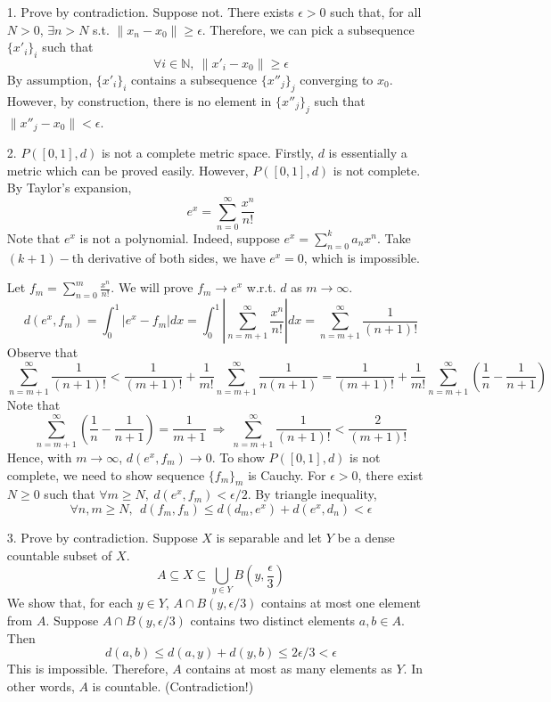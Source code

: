 
\begin{itemize}
	\item[1.] Prove by contradiction. Suppose not. There exists $\epsilon > 0$ such that, for all $N>0$, $\exists n > N$ s.t. $\lVert x_n - x_0\rVert  \ge \epsilon$. Therefore, we can pick a subsequence $\{x'_{i}\}_i$ such that 
	$$
	\forall i\in \mathbb{N},~\lVert x'_i - x_0\rVert \ge \epsilon	
	$$
	By assumption, $\{x'_i\}_i$ contains a subsequence $\{x''_j\}_j$ converging to $x_0$. However, by construction, there is no element in $\{x''_j\}_j$ such that $\lVert x''_j -x_0\rVert < \epsilon$.
	
	\item[2.] 
	$P([0,1],d)$ is not a complete metric space. Firstly, $d$ is essentially a metric which can be proved easily. However, $P([0,1],d)$ is not complete.
	By Taylor's expansion, 
	$$e^x = \sum_{n=0}^\infty \frac{x^n}{n!}$$ 
	Note that $e^x$ is not a polynomial. Indeed, suppose $e^x = \sum_{n=0}^k a_nx^n$. Take $(k+1)-$th derivative of both sides, we have $e^x = 0$, which is impossible.  
	
	Let $f_m = \sum_{n=0}^m \frac{x^n}{n!}$. We will prove $f_m\rightarrow e^x$ w.r.t. $d$ as $m\rightarrow \infty$.
	$$
	d\left(e^x, f_m\right) = \int_{0}^1 \left\lvert e^x - f_m \right\rvert dx = \int_{0}^1 \left\lvert \sum_{n=m+1}^\infty \frac{x^n}{n!} \right\rvert dx = \sum_{n=m+1}^\infty \frac{1}{(n+1)!}
	$$
	Observe that
	$$
	\sum_{n=m+1}^\infty \frac{1}{(n+1)!} < \frac{1}{(m+1)!}+\frac{1}{m!} \sum_{n=m+1}^\infty \frac{1}{n(n+1)} = \frac{1}{(m+1)!}+\frac{1}{m!} \sum_{n=m+1}^\infty \left(\frac{1}{n} - \frac{1}{n+1}\right)
	$$
	Note that $$  \sum_{n=m+1}^\infty \left(\frac{1}{n} - \frac{1}{n+1}\right) = \frac{1}{m+1} ~\Rightarrow~\sum_{n=m+1}^\infty \frac{1}{(n+1)!} < \frac{2}{(m+1)!}$$
	Hence, with $m\rightarrow \infty$, $d(e^x, f_m)\rightarrow 0$. To show $P([0,1], d)$ is not complete, we need to show sequence  $\{f_m\}_m$ is Cauchy. For $\epsilon >0$, there exist $N\ge 0$ such that $\forall m\ge N,~ d(e^x, f_m) < \epsilon/2$. 
	By triangle inequality,
	$$
	\forall n,m \ge N,~~d\left(f_m, f_n\right) \le d\left(d_m, e^x\right) + d\left(e^x, d_n\right) <\epsilon
	$$ 
	
	\item[3.] Prove by contradiction. Suppose $X$ is separable and let $Y$ be a dense countable subset of $X$. 
	$$
	A\subseteq X \subseteq \bigcup_{y\in Y} B\left(y, \frac{\epsilon}{3}\right)
	$$  
	We show that, for each $y\in Y$, $A\cap B\left(y, \epsilon/3\right)$ contains at most one element from $A$. Suppose $A\cap B(y,\epsilon/3)$ contains two distinct elements $a,b \in A$. Then $$d(a,b) \le d(a,y) + d(y,b) \le 2\epsilon/3 <\epsilon$$ This is impossible. Therefore, $A$ contains at most as many elements as $Y$. In other words, $A$ is countable. (Contradiction!)
	

\end{itemize}

